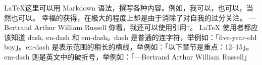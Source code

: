 \markdownRendererInterblockSeparator
{}\LaTeX 这里可以用 Markdown 语法，撰写各种内容。例如，我可以，也可以，当然也可以。\markdownRendererInterblockSeparator
{}\markdownRendererInterblockSeparator
{}\markdownRendererBlockQuoteBegin
幸福的获得，在极大的程度上却是由于消除了对自我的过分关注。 ---Bertrand Arthur William Russell
\markdownRendererBlockQuoteEnd \markdownRendererInterblockSeparator
{}你看，我还可以使用引用↑。\markdownRendererInterblockSeparator
{}\markdownRendererInterblockSeparator
{}LaTeX 使用者都应该知道 dash, en-dash 和 em-dash。dash 是普通的连字符，举例如：「five-year-old boy」。en-dash 是表示范围的稍长的横线，举例如：「以下章节是重点：12--15」。em-dash 则是英文中的破折号，举例如：「---Bertrand Arthur William Russell」\relax